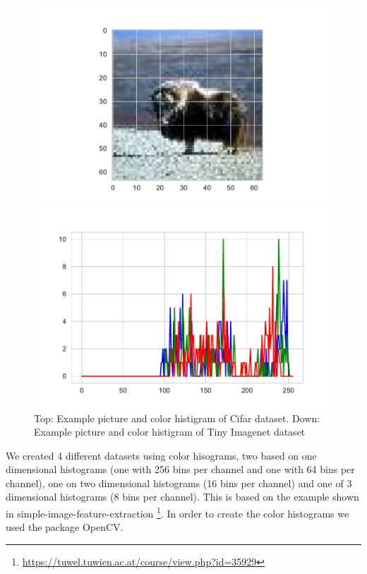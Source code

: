 \documentclass[11pt]{article}
\begin{document}
\begin{figure}[H]
\begin{minipage}[d]{0.6\textwidth}
\end{minipage}
\begin{minipage}[c]{0.4\textwidth}
\includegraphics[width=1\linewidth]{figures/Example_picture_Tiny_Image.pdf}
\end{minipage}
\begin{minipage}[d]{0.6\textwidth}
\includegraphics[width=1\linewidth]{figures/Example_picture_Tiny_Image_hist.pdf}
\end{minipage}
\caption{Top: Example picture and color histigram of Cifar dataset. Down: Example picture and color histigram of Tiny Imagenet dataset}
\label{Example-pictures}
\end{figure}

We created 4 different datasets using color hisograms, two based on one dimensional histograms (one with 256 bins per channel and one with 64 bins per channel), one on two dimensional histograms (16 bins per channel) and one of 3 dimensional histograms (8 bins per channel). This is based on the example shown in simple-image-feature-extraction 
\footnote{\url{https://tuwel.tuwien.ac.at/course/view.php?id=35929}}. In order to create the color histograms we used the package OpenCV. 
\end{document}
